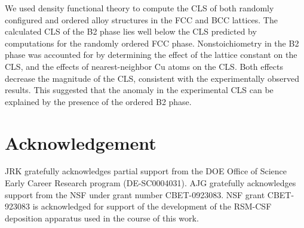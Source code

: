 \documentclass[number, sort&compress, review, 12pt]{elsarticle}
\begin{document}
We used density functional theory to compute the CLS of both randomly configured and ordered alloy structures in the FCC and BCC lattices. The calculated CLS of the B2 phase lies well below the CLS predicted by computations for the randomly ordered FCC phase. Nonstoichiometry in the B2 phase was accounted for by determining the effect of the lattice constant on the CLS, and the effects of nearest-neighbor Cu atoms on the CLS. Both effects decrease the magnitude of the CLS, consistent with the experimentally observed results. This suggested that the anomaly in the experimental CLS can be explained by the presence of the ordered B2 phase.

\section*{Acknowledgement}
JRK gratefully acknowledges partial support from the DOE Office of Science Early Career Research program (DE-SC0004031). AJG gratefully acknowledges support from the NSF under grant number CBET-0923083. NSF grant
CBET-923083 is acknowledged for support of the development of the RSM-CSF
deposition apparatus used in the course of this work.



\end{document}
